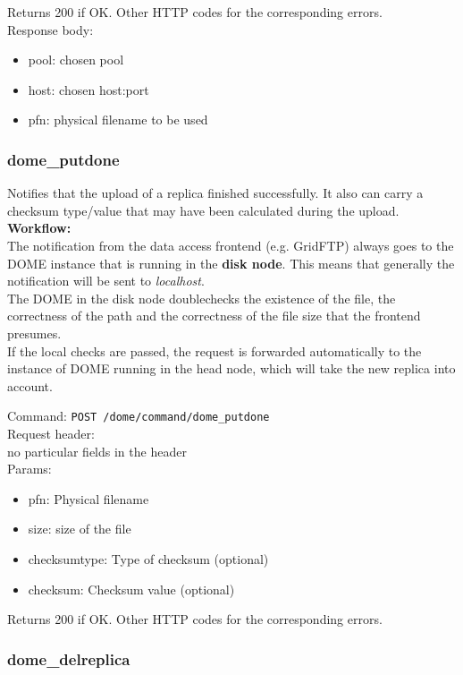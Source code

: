 \documentclass[a4paper,10pt]{scrreprt}
\begin{document}
Returns 200 if OK. Other HTTP codes for the corresponding errors.\\
Response body:
\begin{itemize}
 \item pool: chosen pool
 \item host: chosen host:port
 \item pfn: physical filename to be used
\end{itemize}

\subsubsection{dome\_putdone}
Notifies that the upload of a replica finished successfully. It also can carry a checksum type/value that may have been calculated during the upload.\\

\textbf{Workflow:}\\
The notification from the data access frontend (e.g. GridFTP) always goes to the DOME instance that is running in the \textbf{disk node}. This means that
generally the notification will be sent to \textit{localhost}.\\
The DOME in the disk node doublechecks the existence of the file, the correctness of the path and the correctness of the file size that the frontend presumes.\\
If the local checks are passed, the request is forwarded automatically to the instance of DOME running in the head node, which will take the new replica into account.

Command:
\lstinline"POST /dome/command/dome_putdone"\\
Request header:\\
 no particular fields in the header\\

Params:
\begin{itemize}
 \item pfn: Physical filename
 \item size: size of the file
 \item checksumtype: Type of checksum (optional)
 \item checksum: Checksum value (optional)
\end{itemize}

Returns 200 if OK. Other HTTP codes for the corresponding errors.\\


\subsubsection{dome\_delreplica}
\end{document}

